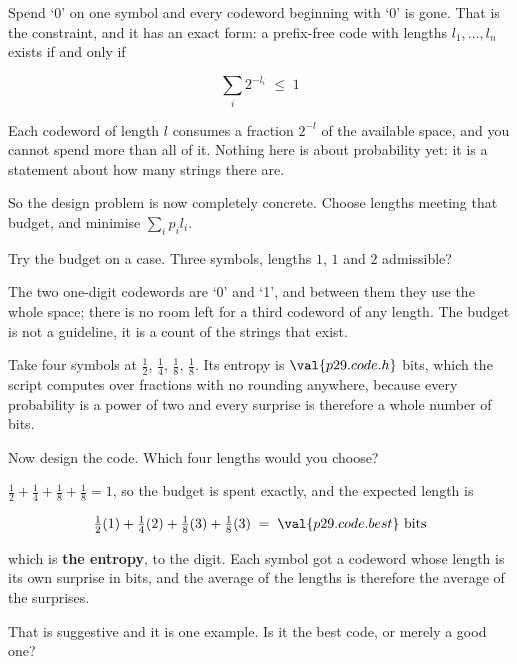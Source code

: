 \begin{fr}

Spend `0' on one symbol and every codeword beginning with `0' is gone. That is
the constraint, and it has an exact form: a prefix-free code with lengths
$l_1, \ldots, l_n$ exists if and only if

\[ \sum_i 2^{-l_i} \;\le\; 1 \]

Each codeword of length $l$ consumes a fraction $2^{-l}$ of the available
space, and you cannot spend more than all of it. Nothing here is about
probability yet: it is a statement about how many strings there are.

So the design problem is now completely concrete. Choose lengths meeting that
budget, and minimise $\sum_i p_i l_i$.


Try the budget on a case. Three symbols, lengths $1$, $1$ and $2$ \dash{}
admissible?
\dotline
\nextframe
\end{fr}

\begin{fr}

The two one-digit codewords are `0' and `1', and between them they use the
whole space; there is no room left for a third codeword of any length. The
budget is not a guideline, it is a count of the strings that exist.

Take four symbols at $\frac{1}{2}$, $\frac{1}{4}$, $\frac{1}{8}$,
$\frac{1}{8}$. Its entropy is $\val{p29.code.h}$ bits, which the script
computes over fractions with no rounding anywhere, because every probability
is a power of two and every surprise is therefore a whole number of bits.

Now design the code. Which four lengths would you choose?
\dotline
\nextframe
\end{fr}

\begin{fr}

$\frac12 + \frac14 + \frac18 + \frac18 = 1$, so the budget is spent exactly,
and the expected length is

\[ \tfrac12(1) + \tfrac14(2) + \tfrac18(3) + \tfrac18(3)
   \;=\; \val{p29.code.best}\ \text{bits} \]

which is \textbf{the entropy}, to the digit. Each symbol got a codeword whose
length is its own surprise in bits, and the average of the lengths is
therefore the average of the surprises.

That is suggestive and it is one example. Is it the best code, or merely a
good one?
\dotline
\nextframe
\end{fr}

